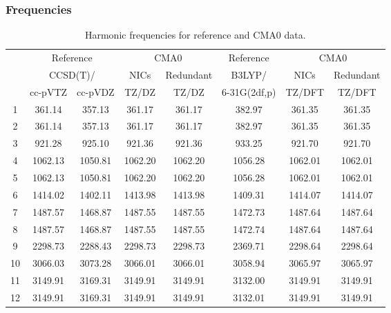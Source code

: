 \documentclass[10pt,oneside]{article}
\begin{document}
\begin{table}[h!]
\subsubsection*{Frequencies}
\centering
\caption{Harmonic frequencies for reference and CMA0 data.}
\begin{tabular}{cccccccc}
\toprule
{} & \multicolumn{2}{c}{Reference} & \multicolumn{2}{c}{CMA0} &    Reference & \multicolumn{2}{c}{CMA0} \\
{} & \multicolumn{2}{c}{CCSD(T)/} &    NICs &  Redundant &       B3LYP/ &    NICs & Redundant \\
{} &   cc-pVTZ & cc-pVDZ &   TZ/DZ &      TZ/DZ & 6-31G(2df,p) &  TZ/DFT &    TZ/DFT \\
\midrule
1  &    361.14 &  357.13 &  361.17 &     361.17 &       382.97 &  361.35 &    361.35 \\
2  &    361.14 &  357.13 &  361.17 &     361.17 &       382.97 &  361.35 &    361.35 \\
3  &    921.28 &  925.10 &  921.36 &     921.36 &       933.25 &  921.70 &    921.70 \\
4  &   1062.13 & 1050.81 & 1062.20 &    1062.20 &      1056.28 & 1062.01 &   1062.01 \\
5  &   1062.13 & 1050.81 & 1062.20 &    1062.20 &      1056.28 & 1062.01 &   1062.01 \\
6  &   1414.02 & 1402.11 & 1413.98 &    1413.98 &      1409.31 & 1414.07 &   1414.07 \\
7  &   1487.57 & 1468.87 & 1487.55 &    1487.55 &      1472.73 & 1487.64 &   1487.64 \\
8  &   1487.57 & 1468.87 & 1487.55 &    1487.55 &      1472.74 & 1487.64 &   1487.64 \\
9  &   2298.73 & 2288.43 & 2298.73 &    2298.73 &      2369.71 & 2298.64 &   2298.64 \\
10 &   3066.03 & 3073.28 & 3066.01 &    3066.01 &      3058.94 & 3065.97 &   3065.97 \\
11 &   3149.91 & 3169.31 & 3149.91 &    3149.91 &      3132.00 & 3149.91 &   3149.91 \\
12 &   3149.91 & 3169.31 & 3149.91 &    3149.91 &      3132.01 & 3149.91 &   3149.91 \\
\bottomrule
\end{tabular}
\end{table}
\end{document}
